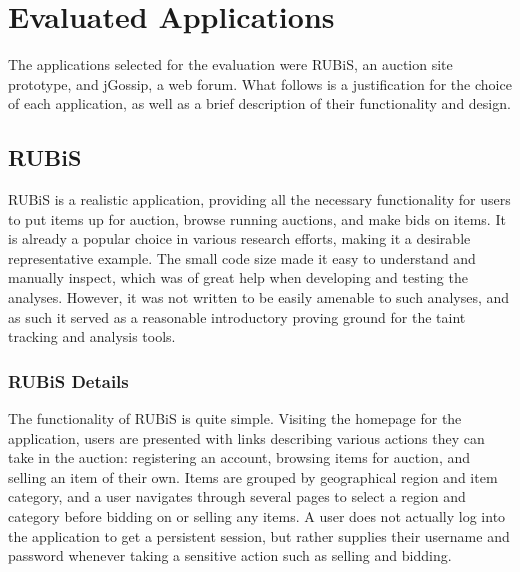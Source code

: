 \documentclass[msc,oneside]{ubcthesis}
\begin{document}



\section{Evaluated Applications}
	The applications selected for the evaluation were RUBiS, an auction site prototype, and jGossip, a web forum. What follows is a justification for the choice of each application, as well as a brief description of their functionality and design.
	
\subsection{RUBiS}
RUBiS is a realistic application, providing all the necessary functionality for users to put items up for auction, browse running auctions, and make bids on items. It is already a popular choice in various research efforts, making it a desirable representative example. The small code size made it easy to understand and manually inspect, which was of great help when developing and testing the analyses. However, it was not written to be easily amenable to such analyses, and as such it served as a reasonable introductory proving ground for the taint tracking and analysis tools.

\subsubsection{RUBiS Details}
The functionality of RUBiS is quite simple. Visiting the homepage for the application, users are presented with links describing various actions they can take in the auction: registering an account, browsing items for auction, and selling an item of their own. Items are grouped by geographical region and item category, and a user navigates through several pages to select a region and category before bidding on or selling any items. A user does not actually log into the application to get a persistent session, but rather supplies their username and password whenever taking a sensitive action such as selling and bidding.\\
\end{document}
